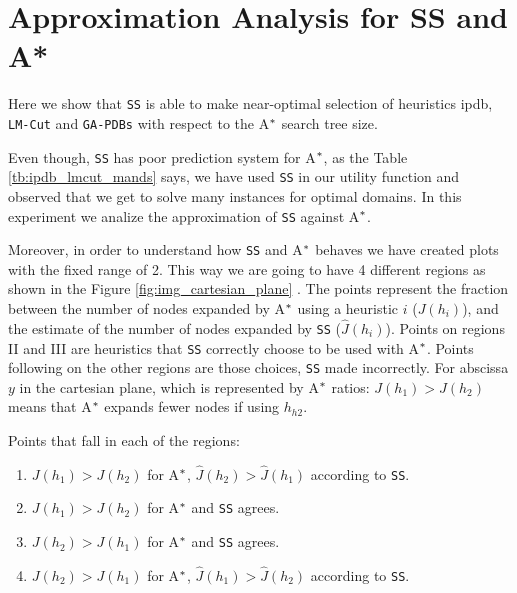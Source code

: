 \section{Approximation Analysis for SS and A*}
\noindent
Here we show that \texttt{SS} is able to make near-optimal selection of heuristics ipdb, \texttt{LM-Cut} and \texttt{GA-PDBs} with respect to the A$\sp{*}$ search tree size.

Even though, \texttt{SS} has poor prediction system for A$\sp{*}$, as the Table \ref{tb:ipdb_lmcut_mands} says, we have used \texttt{SS} in our utility function and observed that we get to solve many instances for optimal domains. In this experiment we analize the approximation of \texttt{SS} against A$\sp{*}$. 

Moreover, in order to understand how \texttt{SS} and A$\sp{*}$ behaves we have created plots with the fixed range of 2. This way we are going to have 4 different regions as shown in the Figure \ref{fig:img_cartesian_plane} . The points represent the fraction between the  number of nodes expanded by A$\sp{*}$ using a heuristic $i$ ($J(h_{i})$), and the estimate of the number of nodes expanded by \texttt{SS} ($\hat{J}(h_{i})$). Points on regions II and III are heuristics that \texttt{SS} correctly choose to be used with A$\sp{*}$. Points following on the other regions are those choices, \texttt{SS} made incorrectly. For abscissa $y$ in the cartesian plane, which is represented by A$\sp{*}$ ratios: $J(h_{1}) > J(h_{2})$ means that A$\sp{*}$ expands fewer nodes if using $h_{h2}$.

Points that fall in each of the regions:
\begin{enumerate}[label=\Roman*] 
\item $J(h_{1}) > J(h_{2})$ for A$\sp{*}$, $\hat{J}(h_{2}) > \hat{J}(h_{1})$ according to \texttt{SS}.
\item $J(h_{1}) > J(h_{2})$ for A$\sp{*}$ and \texttt{SS} agrees.
\item $J(h_{2}) > J(h_{1})$ for A$\sp{*}$ and \texttt{SS} agrees.
\item $J(h_{2}) > J(h_{1})$ for A$\sp{*}$, $\hat{J}(h_{1}) > \hat{J}(h_{2})$ according to \texttt{SS}.
\end{enumerate}

\pagestyle{empty}

